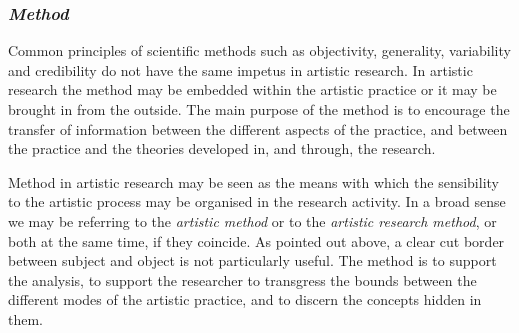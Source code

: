 \documentclass[12pt]{article}
\begin{document}

\subsubsection*{\emph{Method}}

Common principles of scientific methods such as objectivity, generality, variability and credibility do not have the same impetus in artistic research. In artistic research the method may be embedded within the artistic practice or it may be brought in from the outside. The main purpose of the method is to encourage the transfer of information between the different aspects of the practice, and between the practice and the theories developed in, and through, the research.


Method in artistic research may be seen as the means with which the sensibility to the artistic process may be organised in the research activity. In a broad sense we may be referring to the \emph{artistic method} or to the \emph{artistic research method}, or both at the same time, if they coincide. As pointed out above, a clear cut border between subject and object is not particularly useful. The method is to support the analysis, to support the researcher to transgress the bounds between the different modes of the artistic practice, and to discern the concepts hidden in them. 
\end{document}
